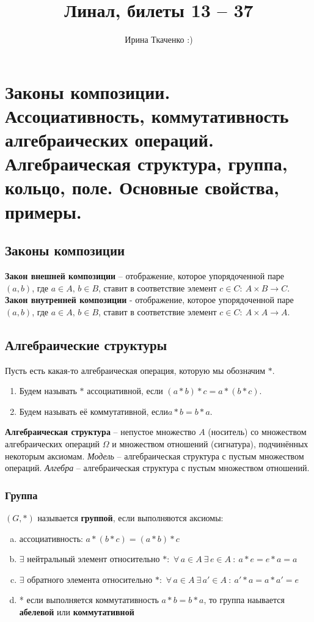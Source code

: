 \documentclass{article}
\title{Линал, билеты 13 -- 37}
\author{Ирина Ткаченко :)}
\date{}
\begin{document}
\maketitle 
\tableofcontents

\newpage
\section{Законы композиции. Ассоциативность, коммутативность алгебраических операций. Алгебраическая структура, группа, кольцо, поле. Основные свойства, примеры.}
\subsection{Законы композиции}
\textbf{Закон внешней композиции} -- отображение, которое упорядоченной паре $(a, b)$, где
$a \in A,\,b \in B$, ставит в соответствие элемент $c\in C :\: A \times B \to C$.
\newline
\newline
\textbf{Закон внутренней композиции} - отображение, которое упорядоченной паре $(a, b)$, где
$a \in A,\,b \in B$, ставит в соответствие элемент $c\in C :\: A \times A \to A$.
\newline
\newline
\subsection{Алгебраические структуры}
Пусть есть какая-то алгебраическая операция, которую мы обозначим $*$. 
\begin{enumerate}
    \item Будем называть $*$ ассоциативной, если $(a*b)*c = a*(b*c)$.
    \item Будем называть её коммутативной, $если a*b = b*a$.
\end{enumerate}
\textbf{Алгебраическая структура} -- непустое множество $A$ (носитель) со множеством алгебраических операций $\Omega$ и множеством отношений (сигнатура), подчинённых некоторым аксиомам. \textit{Модель} -- алгебраическая структура с пустым множеством операций. \textit{Алгебра} -- алгебраическая структура с пустым множеством отношений.
\subsubsection{Группа} 
$(G,*)$ называется \textbf{группой}, если выполняются аксиомы:
    \begin{enumerate}[(a)]
        \item ассоциативность: $a*(b*c)=(a*b)*c$
        \item $\exists$ нейтральный элемент относительно $*$: $\,\forall\,a\in A\:\exists\,e\in A\::\:a*e=e*a=a$
        \item $\exists$ обратного элемента относительно $*$: $\,\forall\,a\in A\:\exists\,a'\in A\::\:a'*a=a*a'=e$
        \item * если выполняется коммутативность $a*b=b*a$, то группа наывается \textbf{абелевой} или \textbf{коммутативной}
    \end{enumerate}
    \newpage
\end{document}
